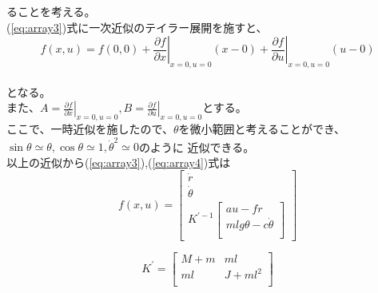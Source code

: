 	ることを考える。\\
	(\ref{eq:array3})式に一次近似のテイラー展開を施すと、\\
	\begin{equation}
		f(x,u) = f(0,0) + \left.\frac{\partial f}{\partial x}\right|_{x=0,u=0}(x-0) + \left.\frac{\partial f}{\partial u}\right|_{x=0,u=0}(u-0)
		\label{eq:eq4}
	\end{equation}
	\\
	となる。\\
	また、$A=\left.\frac{\partial f}{\partial x}\right|_{x=0,u=0} , B=\left.\frac{\partial f}{\partial u}\right|_{x=0,u=0}$とする。\\
	ここで、一時近似を施したので、$\theta$を微小範囲と考えることができ、$\sin{\theta} \simeq  \theta , \cos{\theta} \simeq 1 , \dot{\theta}^{2} \simeq 0$のように
	近似できる。\\
	以上の近似から(\ref{eq:array3}),(\ref{eq:array4})式は\\
	\begin{equation}
		f(x,u)=\left[
		\begin{array}{ccc}
			\dot{r}\\
			\dot{\theta}\\
			K^{'-1}\left[
			\begin{array}{ccc}
				au-f\dot{r}\\
				mlg\theta-c\dot{\theta}\\
			\end{array}
			\right]
		\end{array}
		\right]
		\label{eq:array5}
	\end{equation}
	
	\begin{equation}
		K^{'} = \left[
		\begin{array}{ccc}
			M + m & ml\\
			ml & J+ml^{2}\\
		\end{array}
		\right]
		\label{eq:array6}
	\end{equation}
	
